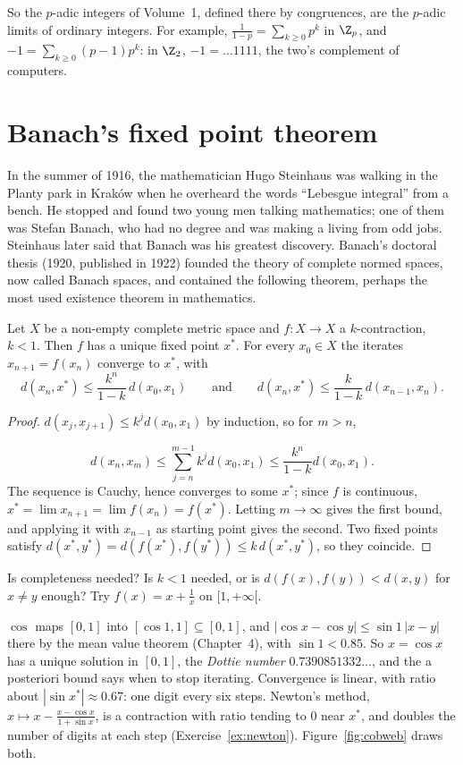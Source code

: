 So the $p$-adic integers of Volume~1, defined there by congruences, are the $p$-adic limits of ordinary integers. For example,
$\frac1{1-p}=\sum_{k\ge0}p^k$ in $\Z_p$, and $-1=\sum_{k\ge0}(p-1)p^k$: in $\Z_2$, $-1=\ldots1111$, the two's complement of computers.


\section{Banach's fixed point theorem}

In the summer of 1916, the mathematician Hugo Steinhaus was walking in the Planty park in Krak\'ow when he overheard the
words ``Lebesgue integral'' from a bench. He stopped and found two young men talking mathematics; one of them was Stefan
Banach, who had no degree and was making a living from odd jobs. Steinhaus later said that Banach was his greatest
discovery. Banach's doctoral thesis (1920, published in 1922) founded the theory of complete normed spaces, now called
Banach spaces, and contained the following theorem, perhaps the most used existence theorem in mathematics.


\begin{theorem}[Banach, 1922]\label{thm:banach}
Let $X$ be a non-empty complete metric space and $f:X\to X$ a $k$-contraction, $k<1$. Then $f$ has a unique fixed point $x^*$. For every
$x_0\in X$ the iterates $x_{n+1}=f(x_n)$ converge to $x^*$, with
\[
d(x_n,x^*)\le\frac{k^n}{1-k}\,d(x_0,x_1)\qquad\text{and}\qquad d(x_n,x^*)\le\frac k{1-k}\,d(x_{n-1},x_n).
\]
\end{theorem}
\begin{proof}
$d(x_{j},x_{j+1})\le k^jd(x_0,x_1)$ by induction, so for $m>n$,

\[
d(x_n,x_m)\le\sum_{j=n}^{m-1}k^jd(x_0,x_1)\le\frac{k^n}{1-k}d(x_0,x_1).
\]
The sequence is Cauchy, hence converges to some $x^*$; since $f$ is continuous,
$x^*=\lim x_{n+1}=\lim f(x_n)=f(x^*)$. Letting $m\to\infty$ gives the first bound, and applying it with $x_{n-1}$ as starting point gives the second.
Two fixed points satisfy $d(x^*,y^*)=d(f(x^*),f(y^*))\le k\,d(x^*,y^*)$, so they coincide.
\end{proof}

\begin{think}
Is completeness needed? Is $k<1$ needed, or is $d(f(x),f(y))<d(x,y)$ for $x\ne y$ enough? Try $f(x)=x+\frac1x$ on $[1,+\infty[$.
\end{think}

\begin{example}\label{ex:cosfixed}
$\cos$ maps $[0,1]$ into $[\cos1,1]\subseteq[0,1]$, and $|\cos x-\cos y|\le\sin1\,|x-y|$ there by the mean value theorem (Chapter~4), with
$\sin1<0.85$. So $x=\cos x$ has a unique solution in $[0,1]$, the \emph{Dottie number} $0.7390851332\ldots$, and the a posteriori bound
says when to stop iterating. Convergence is linear, with ratio about $|\sin x^*|\approx0.67$: one digit every six steps. Newton's
method, $x\mapsto x-\frac{x-\cos x}{1+\sin x}$, is a contraction with ratio tending to $0$ near $x^*$, and doubles the number of digits at each
step (Exercise~\ref{ex:newton}). Figure~\ref{fig:cobweb} draws both.
\end{example}

